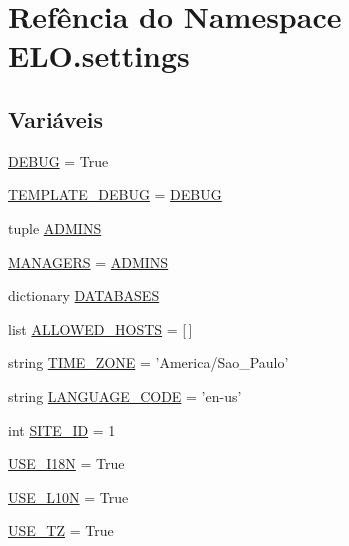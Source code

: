 \hypertarget{namespaceELO_1_1settings}{\section{Refência do Namespace E\-L\-O.\-settings}
\label{df/d5b/namespaceELO_1_1settings}
}
\subsection*{Variáveis}
\begin{DoxyCompactItemize}
\item 
\hyperlink{namespaceELO_1_1settings_a62f457ac29cc6f3e85282c71ce3b4f26}{D\-E\-B\-U\-G} = True
\item 
\hyperlink{namespaceELO_1_1settings_a014930e0bf77feccc65c20212593381e}{T\-E\-M\-P\-L\-A\-T\-E\-\_\-\-D\-E\-B\-U\-G} = \hyperlink{namespaceELO_1_1settings_a62f457ac29cc6f3e85282c71ce3b4f26}{D\-E\-B\-U\-G}
\item 
tuple \hyperlink{namespaceELO_1_1settings_a051220bd8105ba13b2720df11c1950ba}{A\-D\-M\-I\-N\-S}
\item 
\hyperlink{namespaceELO_1_1settings_a43e8826e0b24e337065b4975f3eace4c}{M\-A\-N\-A\-G\-E\-R\-S} = \hyperlink{namespaceELO_1_1settings_a051220bd8105ba13b2720df11c1950ba}{A\-D\-M\-I\-N\-S}
\item 
dictionary \hyperlink{namespaceELO_1_1settings_a91ed1425b7f1cf041960832ce5b54b6e}{D\-A\-T\-A\-B\-A\-S\-E\-S}
\item 
list \hyperlink{namespaceELO_1_1settings_afd72644768367440ae1a89e9fe95cde5}{A\-L\-L\-O\-W\-E\-D\-\_\-\-H\-O\-S\-T\-S} = \mbox{[}$\,$\mbox{]}
\item 
string \hyperlink{namespaceELO_1_1settings_aafd318ffa70db1890eaf1f8621e19d53}{T\-I\-M\-E\-\_\-\-Z\-O\-N\-E} = 'America/Sao\-\_\-\-Paulo'
\item 
string \hyperlink{namespaceELO_1_1settings_a388841a63bae5418e55fb741f938d4fb}{L\-A\-N\-G\-U\-A\-G\-E\-\_\-\-C\-O\-D\-E} = 'en-\/us'
\item 
int \hyperlink{namespaceELO_1_1settings_a31328123344da3768e97b0ac61c342de}{S\-I\-T\-E\-\_\-\-I\-D} = 1
\item 
\hyperlink{namespaceELO_1_1settings_a2d03ced1be44b9d7937bdbc870474ffe}{U\-S\-E\-\_\-\-I18\-N} = True
\item 
\hyperlink{namespaceELO_1_1settings_a863197f2699808509a4c32b38c16eb44}{U\-S\-E\-\_\-\-L10\-N} = True
\item 
\hyperlink{namespaceELO_1_1settings_a8da4c6fc66af84d08bddc0249a473553}{U\-S\-E\-\_\-\-T\-Z} = True

\end{DoxyCompactItemize}
